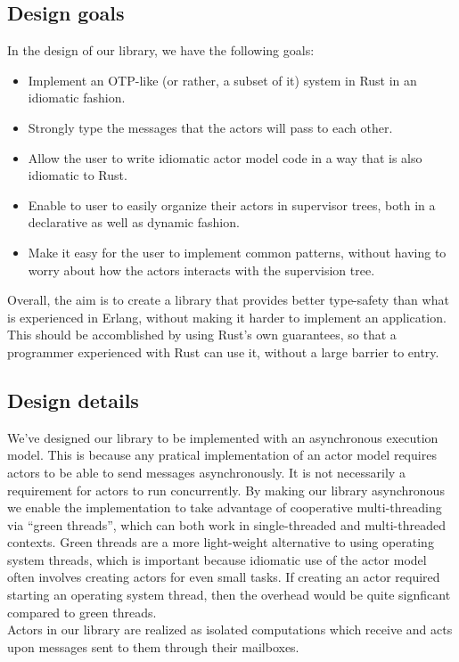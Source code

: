 \documentclass[a4paper]{article}
\begin{document}
\subsection{Design goals}
In the design of our library, we have the following goals:
\begin{itemize}
\item Implement an OTP-like (or rather, a subset of it) system in Rust in an
  idiomatic fashion.
\item Strongly type the messages that the actors will pass to each other.
\item Allow the user to write idiomatic actor model code in a way that is also
  idiomatic to Rust.
\item Enable to user to easily organize their actors in supervisor trees, both
  in a declarative as well as dynamic fashion.
\item Make it easy for the user to implement common patterns, without having to
  worry about how the actors interacts with the supervision tree.
\end{itemize}

Overall, the aim is to create a library that provides better type-safety than
what is experienced in Erlang, without making it harder to implement an
application. This should be accomblished by using Rust's own guarantees, so that
a programmer experienced with Rust can use it, without a large barrier to entry.

\subsection{Design details}
We've designed our library to be implemented with an asynchronous execution model.
This is because any pratical implementation of an actor model requires actors to
be able to send messages asynchronously. It is not necessarily a requirement for
actors to run concurrently. By making our library asynchronous we enable the
implementation to take advantage of cooperative multi-threading via
``green threads'', which can both work in single-threaded and multi-threaded
contexts. Green threads are a more light-weight alternative to using
operating system threads, which is important because idiomatic use of the actor
model often involves creating actors for even small tasks. If creating an actor
required starting an operating system thread, then the overhead would be quite
signficant compared to green threads.\\

\noindent
Actors in our library are realized as isolated computations %
which receive and acts upon messages sent to them through their mailboxes.\\
\end{document}
